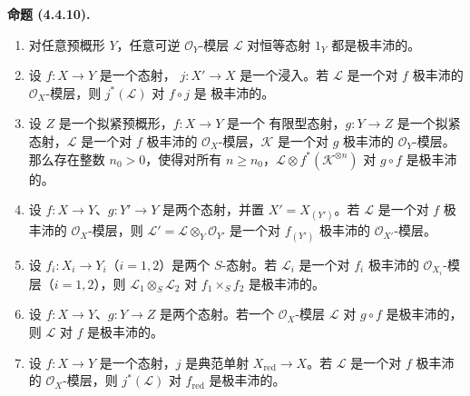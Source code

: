 \documentclass[UTF8,fontset=none,11pt,oneside,openany]{ctexbook}
\newenvironment{proposition}[1][]{\par\medskip\noindent\textbf{命题 (#1).}\ }{\par}
\let\EGAOriginalLabel\label
\renewcommand{\label}[1]{\phantomsection\EGAOriginalLabel{#1}}
\begin{document}
\begin{proposition}[4.4.10]
\label{II.4.4.10-zh}
\begin{enumerate}
  \item[\rm{(i)}] 对任意预概形 $Y$，任意可逆
  $\mathcal{O}_Y$-模层 $\mathcal{L}$ 对恒等态射 $1_Y$ 都是极丰沛的。
  \item[\rm{(i bis)}] 设 $f:X\to Y$ 是一个态射，
  $j:X'\to X$ 是一个浸入。若 $\mathcal{L}$ 是一个对 $f$ 极丰沛的
  $\mathcal{O}_X$-模层，则 $j^*(\mathcal{L})$ 对 $f\circ j$ 是
  极丰沛的。
  \item[\rm{(ii)}] 设 $Z$ 是一个拟紧预概形，$f:X\to Y$ 是一个
  有限型态射，$g:Y\to Z$ 是一个拟紧态射，$\mathcal{L}$ 是一个对
  $f$ 极丰沛的 $\mathcal{O}_X$-模层，$\mathcal{K}$ 是一个对 $g$
  极丰沛的 $\mathcal{O}_Y$-模层。那么存在整数 $n_0>0$，使得对所有
  $n\geq n_0$，$\mathcal{L}\otimes f^*(\mathcal{K}^{\otimes n})$
  对 $g\circ f$ 是极丰沛的。
  \item[\rm{(iii)}] 设 $f:X\to Y$、$g:Y'\to Y$ 是两个态射，并置
  $X'=X_{(Y')}$。若 $\mathcal{L}$ 是一个对 $f$ 极丰沛的
  $\mathcal{O}_X$-模层，则
  $\mathcal{L}'=\mathcal{L}\otimes_Y\mathcal{O}_{Y'}$ 是一个对
  $f_{(Y')}$ 极丰沛的 $\mathcal{O}_{X'}$-模层。
  \item[\rm{(iv)}] 设 $f_i:X_i\to Y_i$（$i=1,2$）是两个
  $S$-态射。若 $\mathcal{L}_i$ 是一个对 $f_i$ 极丰沛的
  $\mathcal{O}_{X_i}$-模层（$i=1,2$），则
  $\mathcal{L}_1\otimes_S\mathcal{L}_2$ 对
  $f_1\times_Sf_2$ 是极丰沛的。
  \item[\rm{(v)}] 设 $f:X\to Y$、$g:Y\to Z$ 是两个态射。若一个
  $\mathcal{O}_X$-模层 $\mathcal{L}$ 对 $g\circ f$ 是极丰沛的，
  则 $\mathcal{L}$ 对 $f$ 是极丰沛的。
  \item[\rm{(vi)}] 设 $f:X\to Y$ 是一个态射，$j$ 是典范单射
  $X_{\mathrm{red}}\to X$。若 $\mathcal{L}$ 是一个对 $f$ 极丰沛的
  $\mathcal{O}_X$-模层，则 $j^*(\mathcal{L})$ 对
  $f_{\mathrm{red}}$ 是极丰沛的。
\end{enumerate}
\end{proposition}
\end{document}
